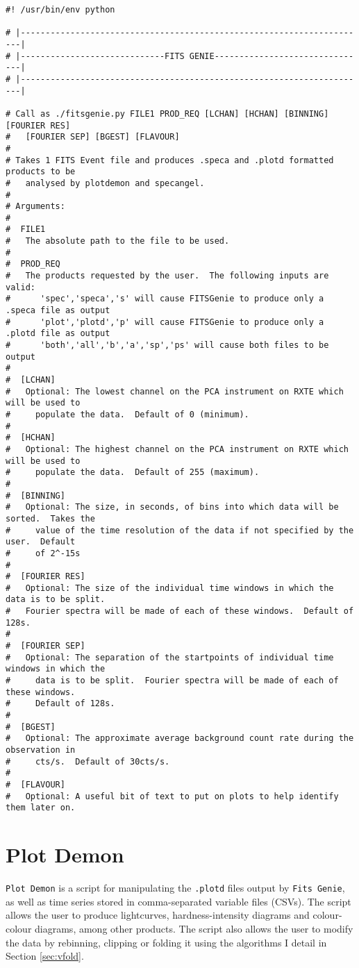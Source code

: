 \begin{verbatim}
#! /usr/bin/env python

# |----------------------------------------------------------------------|
# |-----------------------------FITS GENIE-------------------------------|
# |----------------------------------------------------------------------|

# Call as ./fitsgenie.py FILE1 PROD_REQ [LCHAN] [HCHAN] [BINNING] [FOURIER RES] 
#   [FOURIER SEP] [BGEST] [FLAVOUR]
#
# Takes 1 FITS Event file and produces .speca and .plotd formatted products to be
#   analysed by plotdemon and specangel.
#
# Arguments:
#
#  FILE1
#   The absolute path to the file to be used.
#
#  PROD_REQ
#   The products requested by the user.  The following inputs are valid:
#      'spec','speca','s' will cause FITSGenie to produce only a .speca file as output
#      'plot','plotd','p' will cause FITSGenie to produce only a .plotd file as output
#      'both','all','b','a','sp','ps' will cause both files to be output
#
#  [LCHAN]
#   Optional: The lowest channel on the PCA instrument on RXTE which will be used to
#     populate the data.  Default of 0 (minimum).
#
#  [HCHAN]
#   Optional: The highest channel on the PCA instrument on RXTE which will be used to
#     populate the data.  Default of 255 (maximum).
#
#  [BINNING]
#   Optional: The size, in seconds, of bins into which data will be sorted.  Takes the
#     value of the time resolution of the data if not specified by the user.  Default
#     of 2^-15s
#
#  [FOURIER RES]
#   Optional: The size of the individual time windows in which the data is to be split.
#   Fourier spectra will be made of each of these windows.  Default of 128s.
#
#  [FOURIER SEP]
#   Optional: The separation of the startpoints of individual time windows in which the
#     data is to be split.  Fourier spectra will be made of each of these windows.
#     Default of 128s.
#
#  [BGEST]
#   Optional: The approximate average background count rate during the observation in
#     cts/s.  Default of 30cts/s.
#
#  [FLAVOUR]
#   Optional: A useful bit of text to put on plots to help identify them later on.
\end{verbatim}

\section{Plot Demon}

\par \texttt{Plot Demon} is a script for manipulating the \texttt{.plotd} files output by \texttt{Fits Genie}, as well as time series stored in comma-separated variable files (CSVs).  The script allows the user to produce lightcurves, hardness-intensity diagrams and colour-colour diagrams, among other products.  The script also allows the user to modify the data by rebinning, clipping or folding it using the algorithms I detail in Section \ref{sec:vfold}.

